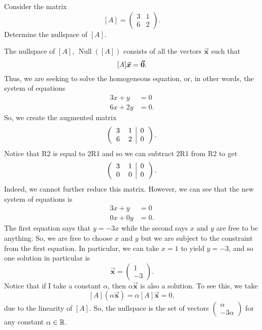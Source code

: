 \documentclass[12pt]{article} %
\begin{document}
\newpage
\begin{problem} 
Consider the matrix
\[
[A] = \begin{pmatrix} 3 & 1 \\ 6 & 2 \end{pmatrix}.
\]
Determine the nullspace of $[A]$.
\end{problem}
\begin{solution}
    The nullspace of $[A]$, $\operatorname{Null}([A])$ consists of all the vectors $\vec{\boldsymbol{x}}$ such that 
    \[
        [A]\vec{\boldsymbol{x}} = \boldsymbol{\vec{0}}.
    \]
    Thus, we are seeking to solve the homogeneous equation, or, in other words, the system of equations
    \begin{align*}
        3x + y &= 0 \\
        6x + 2y &= 0.
    \end{align*}
    So, we create the augmented matrix
    \[
        \left( \begin{tabular}{cc | c} 3 & 1 & 0 \\ 6 & 2 & 0 \end{tabular} \right).
    \]
    Notice that R2 is equal to 2R1 and so we can subtract 2R1 from R2 to get
    \[
        \left( \begin{tabular}{cc | c} 3 & 1 & 0 \\ 0 & 0 & 0 \end{tabular} \right).
    \]
    Indeed, we cannot further reduce this matrix.  However, we can see that the new system of equations is
    \begin{align*}
        3x + y &= 0\\
        0x + 0y &= 0.
    \end{align*}
    The first equation says that $y=-3x$ while the second says $x$ and $y$ are free to be anything.  So, we are free to choose $x$ and $y$ but we are subject to the constraint from the first equation.  In particular, we can take $x=1$ to yield $y=-3$, and so one solution in particular is
    \[
        \vec{\boldsymbol{x}} = \begin{pmatrix} 1 \\ -3 \end{pmatrix}.
    \]
    Notice that if I take a constant $\alpha$, then $\alpha \vec{\boldsymbol{x}}$ is also a solution.  To see this, we take
    \[
        [A] (\alpha \vec{\boldsymbol{x}}) = \alpha [A] \vec{\boldsymbol{x}} = 0,
    \]
    due to the linearity of $[A]$.  So, the nullspace is the set of vectors $\begin{pmatrix} \alpha \\ -3\alpha \end{pmatrix}$ for any constant $\alpha \in \mathbb{R}$.
\end{solution}
\end{document}
